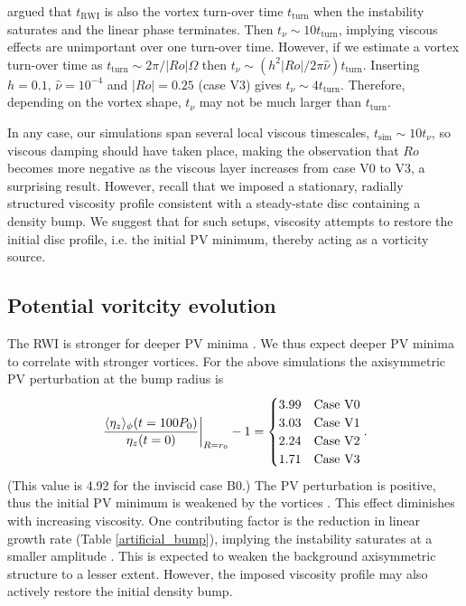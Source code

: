 \cite{meheut13} argued that $t_\mathrm{RWI}$ is also the vortex
turn-over time $t_\mathrm{turn}$ when the instability saturates and
the linear phase terminates. Then 
$t_\nu\sim 10 t_\mathrm{turn}$, implying viscous effects 
are unimportant over one turn-over time. 
However, if we estimate a vortex turn-over time as $t_\mathrm{turn}
\sim 2\pi/|Ro|\Omega$ then $t_\nu\sim (h^2|Ro|/2\pi\hat{\nu})t_\mathrm{turn}$.  
Inserting $h=0.1,\,\hat{\nu}=10^{-4}$ and $|Ro|=0.25$ (case V3) gives 
$t_\nu \sim 4t_\mathrm{turn}$. Therefore, depending on the vortex shape, 
$t_\nu$ may not be much larger than $t_\mathrm{turn}$. 

In any case, our simulations span several local viscous timescales, 
$t_\mathrm{sim}\sim 10t_\nu $, so viscous damping should have taken
place, making the observation that $Ro$ becomes more negative as the 
viscous layer increases from case V0 to V3, a surprising
result. However, recall that we imposed a stationary, radially
structured viscosity profile consistent with a steady-state disc
containing a density bump. We suggest that for such setups, viscosity
attempts to restore the initial disc profile, i.e. the initial PV
minimum, thereby acting as a vorticity source.      

\subsection{Potential voritcity evolution}
The RWI is stronger for deeper PV minima \citep{li00}. We 
thus expect deeper PV minima to correlate with stronger vortices.   
For the above simulations the axisymmetric PV perturbation at the bump
radius is   
\begin{align}\label{vortensity_pert}
  \left.\frac{\langle \eta_z \rangle_\phi(t=100P_0)}{\eta_z(t=0)}\right|_{R=r_0} - 1 = 
  \begin{cases}
    3.99  & \text{Case V0} \\
   3.03  & \text{Case V1} \\
   2.24  & \text{Case V2} \\
   1.71  & \text{Case V3} \\
  \end{cases}.
\end{align} 
(This value is 4.92 for the inviscid case B0.) The PV 
perturbation is positive, thus the initial PV minimum is weakened
by the vortices \citep{meheut10}. This effect
diminishes with increasing viscosity. One contributing factor 
is the reduction in linear growth rate (Table 
\ref{artificial_bump}), implying the  
instability saturates at a smaller amplitude \citep{meheut13}. This  
is expected to weaken the background axisymmetric structure to a lesser
extent. However, the imposed viscosity profile may also actively
restore the initial density bump.     

